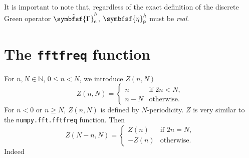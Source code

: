 \documentclass[draft, appendixprefix=true, chapterprefix=true, fontsize=12pt, numbers=noendperiod]{scrbook}
\newcommand{\naturals}{\mathbb N}
\newcommand{\tens}[1]{\symbfsf{#1}}
\newcommand{\tuple}[1]{\mathsf{#1}}
\begin{document}
It is important to note that, regardless of the exact definition of the discrete Green operator \(\hat{\tens\Gamma}_{\tuple{n}}^h\),  \(\tens\eta_{\tuple{p}}^h\) must be \emph{real}.

\section{The \texttt{fftfreq} function}

For \(n, N\in\naturals\), \(0\leq n<N\), we introduce \(Z(n, N)\)
\begin{equation}
  Z(n, N)=
  \begin{cases}
    n & \text{if }2n<N,\\
    n-N & \text{otherwise.}
  \end{cases}
\end{equation}
For \(n<0\) or \(n\geq N\), \(Z(n, N)\) is defined by
\(N\)-periodicity. \(Z\) is very similar to the
\texttt{numpy.fft.fftfreq} function. Then
\begin{equation}
  Z(N-n, N)=
  \begin{cases}
    Z(n) & \text{if }2n=N,\\
    -Z(n) & \text{otherwise.}
  \end{cases}
\end{equation}
Indeed
\end{document}
